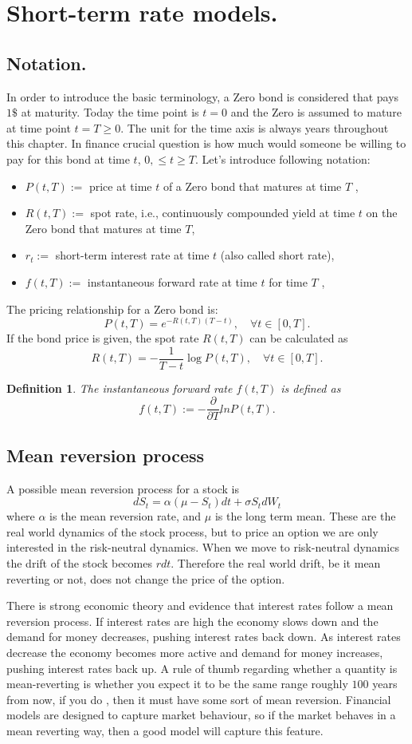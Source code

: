 \documentclass{book}
\newtheorem{definition}{Definition}[section]
\begin{document}
\section{Short-term rate models.}
\subsection{Notation.}
In order to introduce the basic terminology, a Zero bond is considered that pays $1\$$ at maturity. Today the time point is $t = 0$ and the Zero is assumed to mature at time point $t = T\geq 0$. The unit for the time axis is always years throughout this chapter. In finance crucial question is how much would someone be willing to pay for this bond at time $t$, $0,\leq t\geq T.$ Let's introduce following notation:
\begin{itemize}
\item $P(t,T):=$ price at time $t$ of a Zero bond that matures at time $T$ ,
\item $R(t,T):=$ spot rate, i.e., continuously compounded yield at time $t$ on the Zero bond that matures at time $T$,
\item $r_{t}:=$ short-term interest rate at time $t$ (also called short rate),
\item $f(t,T):=$ instantaneous forward rate at time $t$ for time $T$ ,
\end{itemize}
The pricing relationship for a Zero bond is:
$$
P(t,T)=e^{-R(t,T)(T-t)},\quad \forall t\in[0,T].
$$
If the bond price is given, the spot rate $R(t,T)$ can be calculated as
$$
R(t,T)=-\frac{1}{T-t}\log P(t,T),\quad \forall t\in[0,T].
$$
\begin{definition}
The instantaneous forward rate $f(t,T)$ is defined as
$$
f(t,T):=-\frac{\partial}{\partial T}ln P(t,T).
$$
\end{definition}
\subsection{Mean reversion process}
A possible mean reversion process for a stock is
$$
dS_{t}=\alpha(\mu - S_{t})dt+\sigma S_{t}dW_{t}
$$
where $\alpha$ is the mean reversion rate, and $\mu$ is the long term mean. These are the real world dynamics of the stock process, but to price an option we are only interested in the risk-neutral dynamics. When we move to risk-neutral dynamics the drift of the stock becomes $rdt$. Therefore the real world drift, be it mean reverting or not, does not change the price of the option.

There is strong economic theory and evidence that interest rates follow a mean reversion process. If interest rates are high the economy slows down and the demand for money decreases, pushing interest rates back down. As interest rates decrease the economy becomes more active and demand for money increases, pushing interest rates back up. A rule of thumb regarding whether a quantity is mean-reverting is whether you expect it to be the same range roughly $100$ years from now, if you do , then it must have some sort of mean reversion. Financial models are designed to capture market behaviour, so if the market behaves in a mean reverting way, then a good model will capture this feature.
\end{document}
